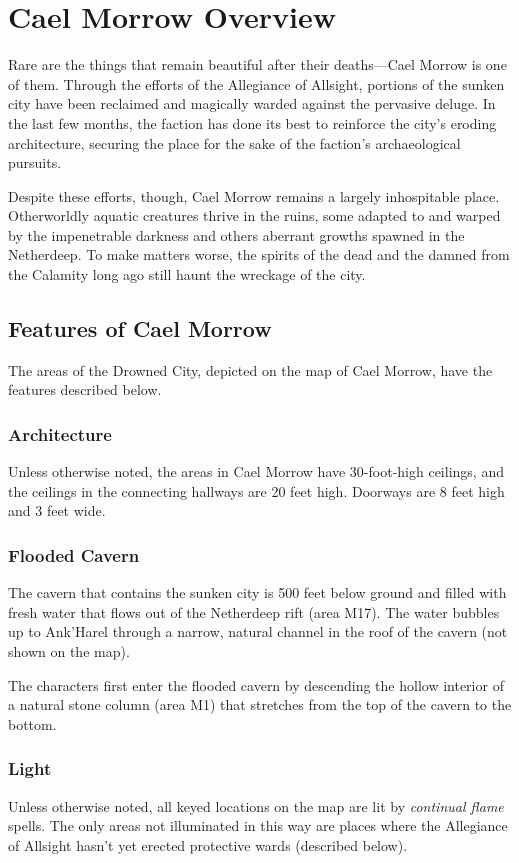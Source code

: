 \documentclass[10pt,a4paper,twoside,fancy,bg=print,twocolumn,openany,nodeprecatedcode]{dndbook}
\begin{document}
\section{Cael Morrow Overview}
Rare are the things that remain beautiful after their deaths—Cael Morrow is one of them. Through the efforts of the Allegiance of Allsight, portions of the sunken city have been reclaimed and magically warded against the pervasive deluge. In the last few months, the faction has done its best to reinforce the city's eroding architecture, securing the place for the sake of the faction's archaeological pursuits.

Despite these efforts, though, Cael Morrow remains a largely inhospitable place. Otherworldly aquatic creatures thrive in the ruins, some adapted to and warped by the impenetrable darkness and others aberrant growths spawned in the Netherdeep. To make matters worse, the spirits of the dead and the damned from the Calamity long ago still haunt the wreckage of the city.

\subsection{Features of Cael Morrow}
The areas of the Drowned City, depicted on the map of Cael Morrow, have the features described below.

\subsubsection{Architecture}
Unless otherwise noted, the areas in Cael Morrow have 30-foot-high ceilings, and the ceilings in the connecting hallways are 20 feet high. Doorways are 8 feet high and 3 feet wide.

\subsubsection{Flooded Cavern}
The cavern that contains the sunken city is 500 feet below ground and filled with fresh water that flows out of the Netherdeep rift (area M17). The water bubbles up to Ank'Harel through a narrow, natural channel in the roof of the cavern (not shown on the map).

The characters first enter the flooded cavern by descending the hollow interior of a natural stone column (area M1) that stretches from the top of the cavern to the bottom.

\subsubsection{Light}
Unless otherwise noted, all keyed locations on the map are lit by \textit{continual flame} spells. The only areas not illuminated in this way are places where the Allegiance of Allsight hasn't yet erected protective wards (described below).
\end{document}
